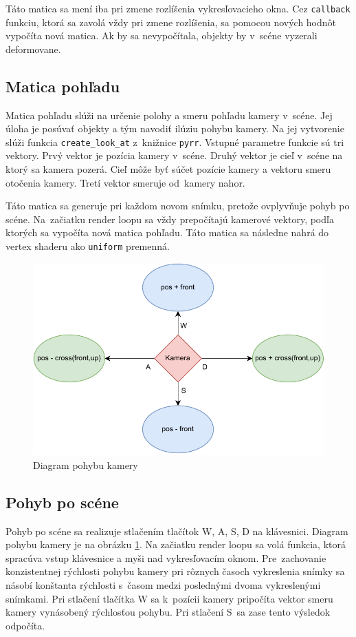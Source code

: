 Táto matica sa mení iba pri zmene rozlíšenia vykresľovacieho okna. Cez \verb|callback| funkciu, ktorá sa zavolá vždy pri zmene rozlíšenia, sa pomocou nových hodnôt vypočíta nová matica. Ak by sa nevypočítala, objekty by v~scéne vyzerali deformovane.

\subsection*{Matica pohľadu}
\label{viewmat}
Matica pohľadu slúži na určenie polohy a smeru pohľadu kamery v~scéne. Jej úloha je posúvať objekty a tým navodiť ilúziu pohybu kamery. Na jej vytvorenie slúži funkcia \verb|create_look_at| z~knižnice \verb|pyrr|. Vstupné parametre funkcie sú tri vektory. Prvý vektor je pozícia kamery v~scéne. Druhý vektor je cieľ v~scéne na ktorý sa kamera pozerá. Cieľ môže byť súčet pozície kamery a vektoru smeru otočenia kamery. Tretí vektor smeruje od~kamery nahor.

Táto matica sa generuje pri každom novom snímku, pretože ovplyvňuje pohyb po scéne. Na~začiatku render loopu sa vždy prepočítajú kamerové vektory, podľa ktorých sa vypočíta nová matica pohľadu. Táto matica sa následne nahrá do vertex shaderu ako \verb|uniform| premenná.

\begin{figure}[b!] \label{MoveDia}
    \centering
    \includegraphics[width=0.60\linewidth]{obrazky-figures/CamMovement.drawio.pdf}
    \caption{Diagram pohybu kamery}
\end{figure}

\subsection*{Pohyb po scéne}
\label{Movement}
Pohyb po scéne sa realizuje stlačením tlačítok W, A, S, D na klávesnici. Diagram pohybu kamery je na obrázku \ref{MoveDia}. Na začiatku render loopu sa volá funkcia, ktorá spracúva vstup klávesnice a myši nad vykresľovacím oknom. Pre~zachovanie konzistentnej rýchlosti pohybu kamery pri rôznych časoch vykreslenia snímky sa násobí konštanta rýchlosti s~časom medzi poslednými dvoma vykreslenými snímkami. Pri stlačení tlačítka W sa k~pozícii kamery pripočíta vektor smeru kamery vynásobený rýchlosťou pohybu. Pri stlačení S~sa zase tento výsledok odpočíta.

